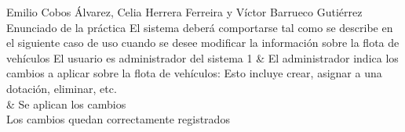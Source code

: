 {Emilio Cobos Álvarez, Celia Herrera Ferreira y Víctor Barrueco Gutiérrez}
{Enunciado de la práctica}
{}
{}
{El sistema deberá comportarse tal como se describe en el siguiente caso de uso cuando se desee modificar la información sobre la flota de vehículos}
{El usuario es administrador del sistema}
{
1 & El administrador indica los cambios a aplicar sobre la flota de vehículos: Esto incluye crear, asignar a una dotación, eliminar, etc. \\  & Se aplican los cambios \\
}
{Los cambios quedan correctamente registrados}
{}

